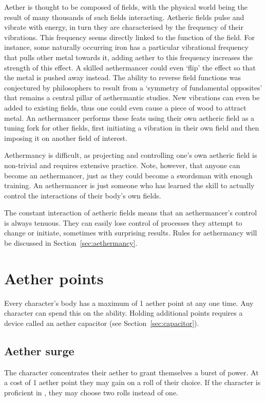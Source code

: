 \documentclass[a4paper,11pt,oneside]{book}
\newcommand{\textlf}[1]{\textbf{\titlecap{#1}}}
\begin{document}
Aether is thought to be composed of fields, with the physical world being the result of many thousands of such fields interacting. Aetheric fields pulse and vibrate with energy, in turn they are characterised by the frequency of their vibrations. This frequency seems directly linked to the function of the field. For instance, some naturally occurring iron has a particular vibrational frequency that pulls other metal towards it, adding aether to this frequency increases the strength of this effect. A skilled aethermancer could even `flip' the effect so that the metal is pushed away instead. The ability to reverse field functions was conjectured by philosophers to result from a `symmetry of fundamental opposites' that remains a central pillar of aethermantic studies. New vibrations can even be added to existing fields, thus one could even cause a piece of wood to attract metal. An aethermancer performs these feats using their own aetheric field as a tuning fork for other fields, first initiating a vibration in their own field and then imposing it on another field of interest.

Aethermancy is difficult, as projecting and controlling one's own aetheric field is non-trivial and requires extensive practice. Note, however, that anyone can become an aethermancer, just as they could become a swordsman with enough training. An aethermancer is just someone who has learned the skill to actually control the interactions of their body's own fields. 

The constant interaction of aetheric fields means that an aethermancer's control is always tenuous. They can easily lose control of processes they attempt to change or initiate, sometimes with surprising results. Rules for aethermancy will be discussed in Section~\ref{sec:aethermancy}.

\section{Aether points}
Every character's body has a maximum of 1 aether point at any one time. Any character can spend this on the \textlf{aether surge} ability. Holding additional points requires a device called an aether capacitor (see Section~\ref{sec:capacitor}).

\subsection{Aether surge}
The character concentrates their aether to grant themselves a burst of power. At a cost of 1 aether point they may gain \textlf{edge+} on a roll of their choice. If the character is proficient in \textlf{aethermancy}, they may choose two rolls instead of one.
\end{document}
